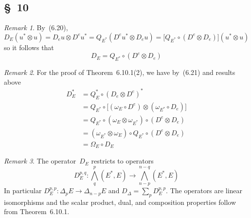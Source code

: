 \documentclass[letterpaper,12pt]{article}
\newcommand{\after}{\circ}
\newcommand{\tprod}{\otimes}
\newcommand{\bigeprod}{\bigwedge}
\newcommand{\medeprod}{{\textstyle\bigeprod}}
\theoremstyle{definition}
\theoremstyle{remark}
\newtheorem*{rmk}{Remark}
\begin{document}
\subsection*{\S~10}
\begin{rmk}
By~(6.20),
\[D_E(u^*\tprod u)=D_e u\tprod D^e u^*=Q_{E^*}(D^e u^*\tprod D_e u)=\bigl[Q_{E^*}\after(D^e\tprod D_e)\bigr](u^*\tprod u)\]
so it follows that
\[D_E=Q_{E^*}\after(D^e\tprod D_e)\]
\end{rmk}

\begin{rmk}
For the proof of Theorem~6.10.1(2), we have by~(6.21) and results above
\begin{align*}
D_E^*&=Q_E^*\after(D_e\tprod D^e)^*\\
	&=Q_{E^*}\after\bigl[(\omega_E\after D^e)\tprod(\omega_{E^*}\after D_e)\bigr]\\
	&=Q_{E^*}\after(\omega_E\tprod\omega_{E^*})\after(D^e\tprod D_e)\\
	&=(\omega_{E^*}\tprod\omega_E)\after Q_{E^*}\after(D^e\tprod D_e)\\
	&=\Omega_E\after D_E
\end{align*}
\end{rmk}

\begin{rmk}
The operator~\(D_E\) restricts to operators
\[D_E^{p,q}:\medeprod^p_q(E^*,E)\to\medeprod^{n-q}_{n-p}(E^*,E)\]
In particular \(D_E^{p,p}:\Delta_p E\to\Delta_{n-p}E\) and \(D_{\Delta}=\sum_p D_E^{p,p}\). The operators are linear isomorphisms and the scalar product, dual, and composition properties follow from Theorem~6.10.1.
\end{rmk}
\end{document}
